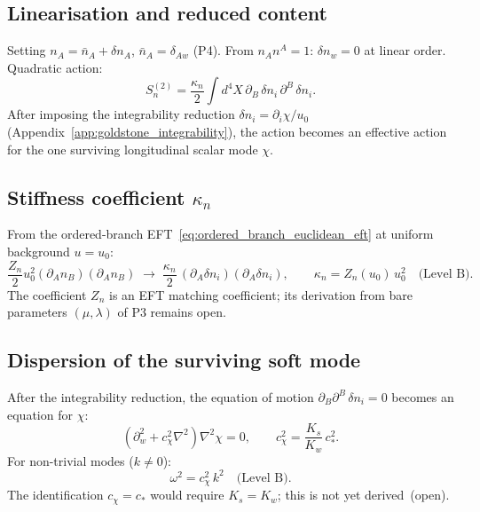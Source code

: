 \documentclass[11pt,a4paper]{article}
\numberwithin{equation}{section}
\begin{document}
\subsection*{Linearisation and reduced content}

Setting $n_A=\bar{n}_A+\delta n_A$, $\bar{n}_A=\delta_{Aw}$ (P4).
From $n_A n^A=1$: $\delta n_w=0$ at linear order.
Quadratic action:
\begin{equation}
  \label{eq:Sn_quadratic_v2}
  S_n^{(2)}=\frac{\kappa_n}{2}\int d^4X\,\partial_B\,\delta n_i\,\partial^B\,\delta n_i.
\end{equation}
After imposing the integrability reduction $\delta n_i=\partial_i\chi/u_0$
(Appendix~\ref{app:goldstone_integrability}), the action becomes an
effective action for the one surviving longitudinal scalar mode $\chi$.

\subsection*{Stiffness coefficient $\kappa_n$}

From the ordered-branch EFT~\eqref{eq:ordered_branch_euclidean_eft}
at uniform background $u=u_0$:
\begin{equation}
  \frac{Z_n}{2}u_0^2(\partial_A n_B)(\partial_A n_B)
  \;\to\;
  \frac{\kappa_n}{2}\,(\partial_A \delta n_i)(\partial_A \delta n_i),
  \qquad \kappa_n = Z_n(u_0)\,u_0^2 \quad\text{(Level~B)}.
\end{equation}
The coefficient $Z_n$ is an EFT matching coefficient; its derivation
from bare parameters $(\mu,\lambda)$ of P3 remains open.

\subsection*{Dispersion of the surviving soft mode}

After the integrability reduction, the equation of motion
$\partial_B\partial^B\,\delta n_i=0$ becomes an equation for $\chi$:
\begin{equation}
  (\partial_w^2+c_\chi^2\nabla^2)\nabla^2\chi=0,
  \qquad
  c_\chi^2=\frac{K_s}{K_w}\,c_*^2.
\end{equation}
For non-trivial modes ($k\neq 0$):
\begin{equation}
  \label{eq:eon_lorentz}
  \omega^2=c_\chi^2\,k^2 \quad\text{(Level~B)}.
\end{equation}
The identification $c_\chi=c_*$ would require $K_s=K_w$; this is not
yet derived~(open).
\end{document}
